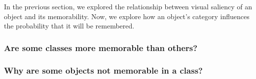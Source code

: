 In the previous section, we explored the relationship between visual saliency of an object and its memorability. Now, we explore how an object's category influences the probability that it will be remembered.

\subsubsection{Are some classes more memorable than others?}



\subsubsection{Why are some objects not memorable in a class?}



